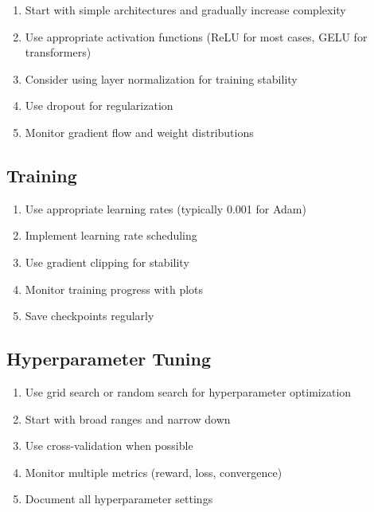 \begin{enumerate}
    \item Start with simple architectures and gradually increase complexity
    \item Use appropriate activation functions (ReLU for most cases, GELU for transformers)
    \item Consider using layer normalization for training stability
    \item Use dropout for regularization
    \item Monitor gradient flow and weight distributions
\end{enumerate}

\subsection{Training}

\begin{enumerate}
    \item Use appropriate learning rates (typically 0.001 for Adam)
    \item Implement learning rate scheduling
    \item Use gradient clipping for stability
    \item Monitor training progress with plots
    \item Save checkpoints regularly
\end{enumerate}

\subsection{Hyperparameter Tuning}

\begin{enumerate}
    \item Use grid search or random search for hyperparameter optimization
    \item Start with broad ranges and narrow down
    \item Use cross-validation when possible
    \item Monitor multiple metrics (reward, loss, convergence)
    \item Document all hyperparameter settings
\end{enumerate} 